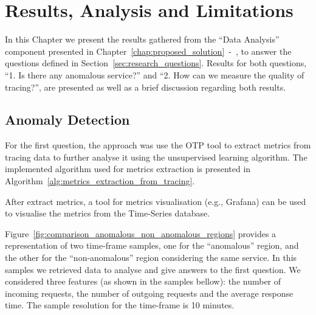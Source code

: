 \glsresetall
\chapter{Results, Analysis and Limitations}
\label{chap:results_analysis_and_limitations}

In this Chapter we present the results gathered from the ``Data Analysis'' component presented in Chapter~\ref{chap:proposed_solution}~-~, to answer the questions defined in Section~\ref{sec:research_questions}. Results for both questions, ``1. Is there any anomalous service?'' and ``2. How can we measure the quality of tracing?'', are presented as well as a brief discussion regarding both results.

\section{Anomaly Detection}
\label{sec:anomaly_detection}

For the first question, the approach was use the OTP tool to extract metrics from tracing data to further analyse it using the unsupervised learning algorithm. The implemented algorithm used for metrics extraction is presented in Algorithm~\ref{alg:metrics_extraction_from_tracing}.

After extract metrics, a tool for metrics visualisation (e.g., Grafana) can be used to visualise the metrics from the Time-Series database.


Figure~\ref{fig:comparison_anomalous_non_anomalous_regions} provides a representation of two time-frame samples, one for the ``anomalous'' region, and the other for the ``non-anomalous'' region considering the same service. In this samples we retrieved data to analyse and give answers to the first question. We considered three features (as shown in the samples bellow): the number of incoming requests, the number of outgoing requests and the average response time. The sample resolution for the time-frame is 10 minutes.

